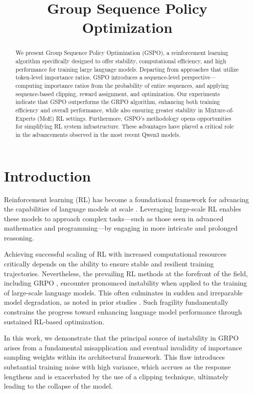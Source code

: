 \title{Group Sequence Policy Optimization}

\begin{abstract}
We present Group Sequence Policy Optimization (GSPO), a reinforcement learning algorithm specifically designed to offer stability, computational efficiency, and high performance for training large language models. Departing from approaches that utilize token-level importance ratios, GSPO introduces a sequence-level perspective—computing importance ratios from the probability of entire sequences, and applying sequence-based clipping, reward assignment, and optimization. Our experiments indicate that GSPO outperforms the GRPO algorithm, enhancing both training efficiency and overall performance, while also ensuring greater stability in Mixture-of-Experts (MoE) RL settings. Furthermore, GSPO's methodology opens opportunities for simplifying RL system infrastructure. These advantages have played a critical role in the advancements observed in the most recent Qwen3 models.
\end{abstract}

\section{Introduction}
\label{sec:intro}

Reinforcement learning (RL) has become a foundational framework for advancing the capabilities of language models at scale \citep{o1,dpsk-r1,qwq32b,qwen3}. Leveraging large-scale RL enables these models to approach complex tasks—such as those seen in advanced mathematics and programming—by engaging in more intricate and prolonged reasoning.

Achieving successful scaling of RL with increased computational resources critically depends on the ability to ensure stable and resilient training trajectories. Nevertheless, the prevailing RL methods at the forefront of the field, including GRPO \citep{grpo}, encounter pronounced instability when applied to the training of large-scale language models. This often culminates in sudden and irreparable model degradation, as noted in prior studies \citep{qwen3, minimax-m1}. Such fragility fundamentally constrains the progress toward enhancing language model performance through sustained RL-based optimization.

In this work, we demonstrate that the principal source of instability in GRPO arises from a fundamental misapplication and eventual invalidity of importance sampling weights within its architectural framework. This flaw introduces substantial training noise with high variance, which accrues as the response lengthens and is exacerbated by the use of a clipping technique, ultimately leading to the collapse of the model.


